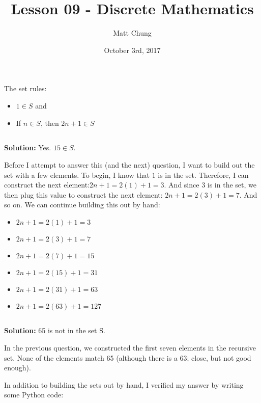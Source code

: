 \documentclass{article}
\title{Lesson 09 - Discrete Mathematics}
\author{Matt Chung}
\date{October 3rd, 2017}
\begin{document}
\maketitle

\section{}

The set rules:
\begin{itemize}
    \item $1 \in S$ and
    \item If $n \in S$, then $2n + 1 \in S$
\end{itemize}

\subsection{}
\textbf{Solution:} Yes. $15 \in S$.

Before I attempt to answer this (and the next) question, I want to build out the set with a few elements. To begin, I know that $1$ is in the set. Therefore, I can construct the next element:$2n + 1 = 2(1) + 1 = 3$. And since $3$ is in the set, we then plug this value to construct the next element: $2n + 1 = 2(3) + 1 = 7$. And so on. We can continue building this out by hand:

\begin{itemize}
    \item $2n + 1 = 2(1) + 1 = 3$
    \item $2n + 1 = 2(3) + 1 = 7$
    \item $2n + 1 = 2(7) + 1 = 15$
    \item $2n + 1 = 2(15) + 1 = 31$
    \item $2n + 1 = 2(31) + 1 = 63$
    \item $2n + 1 = 2(63) + 1 = 127$
\end{itemize}

\newpage

\subsection{}
\textbf{Solution: } 65 is not in the set S.

In the previous question, we constructed the first seven elements in the recursive set. None of the elements match 65 (although there is a 63; close, but not good enough).

In addition to building the sets out by hand, I verified my answer by writing some Python code: 
\end{document}
